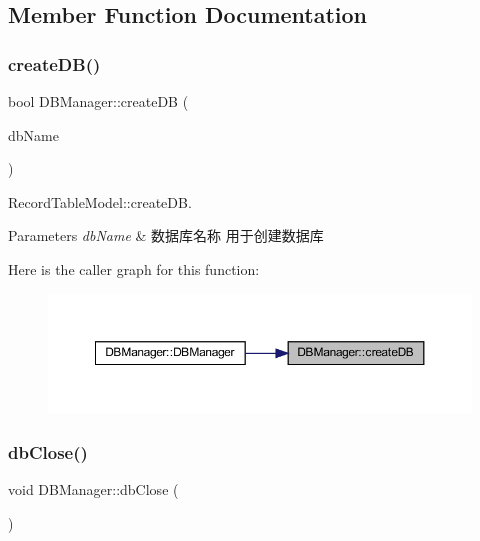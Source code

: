 \subsection{Member Function Documentation}
\mbox{\label{class_d_b_manager_a657d030abeeaa632bf2d1a60e04df1e3}} 
\subsubsection{\texorpdfstring{createDB()}{createDB()}}
{\footnotesize\ttfamily bool D\+B\+Manager\+::create\+DB (\begin{DoxyParamCaption}\item[{const Q\+String \&}]{db\+Name }\end{DoxyParamCaption})\hspace{0.3cm}{\ttfamily [private]}}



Record\+Table\+Model\+::create\+DB. 


\begin{DoxyParams}{Parameters}
{\em db\+Name} & 数据库名称 用于创建数据库 \\
\hline
\end{DoxyParams}
Here is the caller graph for this function\+:
\nopagebreak
\begin{figure}[H]
\begin{center}
\leavevmode
\includegraphics[width=350pt]{class_d_b_manager_a657d030abeeaa632bf2d1a60e04df1e3_icgraph}
\end{center}
\end{figure}
\mbox{\label{class_d_b_manager_abe9b0e3d863e27668b62a7fa43227fa5}} 
\subsubsection{\texorpdfstring{dbClose()}{dbClose()}}
{\footnotesize\ttfamily void D\+B\+Manager\+::db\+Close (\begin{DoxyParamCaption}{ }\end{DoxyParamCaption})}



